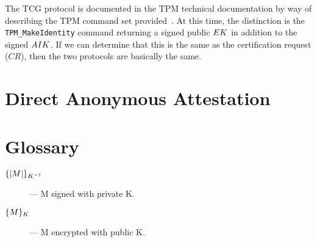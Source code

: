 \documentclass[10pt]{article}
\begin{document}
The TCG protocol is documented in the TPM technical documentation by
way of describing the TPM command set
provided~\citep{---::TCG-TPM-Specifi}.  At this time, the distinction
is the \verb+TPM_MakeIdentity+ command returning a signed public
$EK$ in addition to the signed $AIK$.  If we can
determine that this is the same as the certification request ($CR$),
then the two protocols are basically the same.

\section{Direct Anonymous Attestation}

\nocite{---::TCG-TPM-Specifi,Ryan:09:Introduction-to}

\section{Glossary}

\begin{description}
\item[$\{|M|\}_{K^{-1}}$] --- M signed with private K.
\item[$\{M\}_{K}$]  --- M encrypted with public K.
\end{description}


\end{document}
